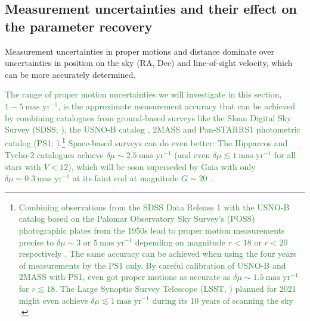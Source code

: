 \documentclass[iop,revtex4,numberedappendix,appendixfloats]{emulateapj}
\newcommand{\NEW}[1]{\textcolor{ForestGreen}{#1}}
\begin{document}
\subsection{Measurement uncertainties and their effect on the parameter recovery} \label{sec:results_errors}

Measurement uncertainties in proper motions and distance dominate over uncertainties in position on the sky (RA, Dec) and line-of-sight velocity, which can be more accurately determined.

\NEW{The range of proper motion uncertainties we will investigate in this section, $1-5~\text{mas yr}^{-1}$, is the approximate measurement accuracy that can be achieved by combining catalogues from ground-based surveys like the  Sloan Digital Sky Survey (SDSS; \citealt{2003AJ....126.2081A}), the USNO-B catalog \citep{2003AJ....125..984M}, 2MASS \citep{2006AJ....131.1163S} and Pan-STARRS1 photometric catalog (PS1;  \citealt{2010SPIE.7733E..0EK}).}\footnote{\NEW{Combining observations from the SDSS Data Release 1 with the USNO-B catalog based on the Palomar Observatory Sky Survey's (POSS) photographic plates from the 1950s lead to proper motion measurements precise to $\delta\mu\sim3$ or $5~\text{mas yr}^{-1}$ depending on magnitude $r<18$ or $r<20$ respectively \citep{2004AJ....127.3034M,2008AJ....136..895M,2004ApJS..152..103G}. The same accuracy can be achieved when using the four years of measurements by the PS1 only. By careful calibration of USNO-B and 2MASS with PS1, \citet{2015ApJ...809...59S} even got proper motions as accurate as} \NEW{$\delta \mu\sim1.5~\text{mas yr}^{-1}$ for $r\lesssim 18$. The Large Synoptic Survey Telescope (LSST, \citealt{2008arXiv0805.2366I}) planned for 2021 might even achieve $\delta\mu \lesssim 1~\text{mas yr}^{-1}$ during its 10 years of scanning the sky \citep{2008IAUS..248..537I}.}} \NEW{Space-based surveys can do even better: The Hipparcos \citep{1997ESASP1200.....E} and Tycho-2 \citep{2000A&A...355L..27H} catalogues achieve $\delta \mu\sim2.5~\text{mas yr}^{-1}$ (and even $\delta\mu \lesssim 1~\text{mas yr}^{-1}$ for all stars with $V <12$), which will be soon superseded by Gaia with only $\delta \mu\sim0.3~\text{mas yr}^{-1}$ at its faint end at magnitude $G\sim20$ \citep{2014EAS....67...23D}.}
\end{document}
